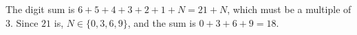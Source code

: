 The digit sum is $6+5+4+3+2+1+N=21+N$, which must be a multiple of $3$. Since $21$ is, $N\in\{0,3,6,9\}$, and the sum is $0+3+6+9=\boxed{18}$.
